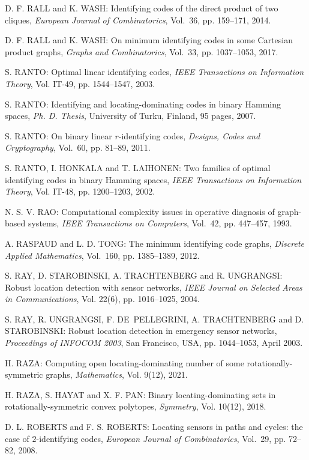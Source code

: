 \begin{thebibliography}{999}
D. F. RALL and K. WASH: Identifying codes of the direct product of two cliques, {\it European Journal of Combinatorics}, Vol.~36, pp. 159--171, 2014.

D. F. RALL and K. WASH: On minimum identifying codes in some Cartesian product graphs, {\it Graphs and Combinatorics}, Vol.~33, pp. 1037--1053, 2017.

S. RANTO: Optimal linear identifying codes, {\it IEEE Transactions on Information Theory}, Vol. IT-49, pp. 1544--1547, 2003.

S. RANTO: Identifying and locating-dominating codes in binary Hamming spaces, {\it Ph. D. Thesis}, University of Turku, Finland, 95 pages, 2007.

S. RANTO: On binary linear $r$-identifying codes, {\it Designs, Codes and Cryptography}, Vol.~60, pp. 81--89, 2011.

S. RANTO, I. HONKALA and T. LAIHONEN: Two families of optimal identifying codes in binary Hamming spaces, {\it IEEE Transactions on Information Theory}, Vol. IT-48, pp. 1200--1203, 2002.

N. S. V. RAO: Computational complexity issues in operative diagnosis of graph-based systems, {\it IEEE Transactions on Computers}, Vol.~42, pp. 447--457, 1993.

A. RASPAUD and L. D. TONG: The minimum identifying code graphs, {\it Discrete Applied Mathematics}, Vol.~160, pp. 1385--1389, 2012.

S. RAY, D. STAROBINSKI, A. TRACHTENBERG and R. UNGRANGSI: Robust location detection with sensor networks, {\it IEEE Journal on Selected Areas in Communications}, Vol. 22(6), pp. 1016--1025, 2004.

S. RAY, R. UNGRANGSI, F. DE~PELLEGRINI, A. TRACHTENBERG and D. STAROBINSKI: Robust location detection in emergency sensor networks, {\it Proceedings of INFOCOM 2003}, San Francisco, USA, pp. 1044--1053, April 2003.

H. RAZA: Computing open locating-dominating number of some rotationally-symmetric graphs, {\it Mathematics}, Vol. 9(12), 2021.

H. RAZA, S. HAYAT and X. F. PAN: Binary locating-dominating sets in rotationally-symmetric convex polytopes, {\it Symmetry}, Vol. 10(12), 2018.

D. L. ROBERTS and F. S. ROBERTS: Locating sensors in paths and cycles: the case of $2$-identifying codes, {\it European Journal of Combinatorics}, Vol.~29, pp. 72--82, 2008.


\end{thebibliography}
